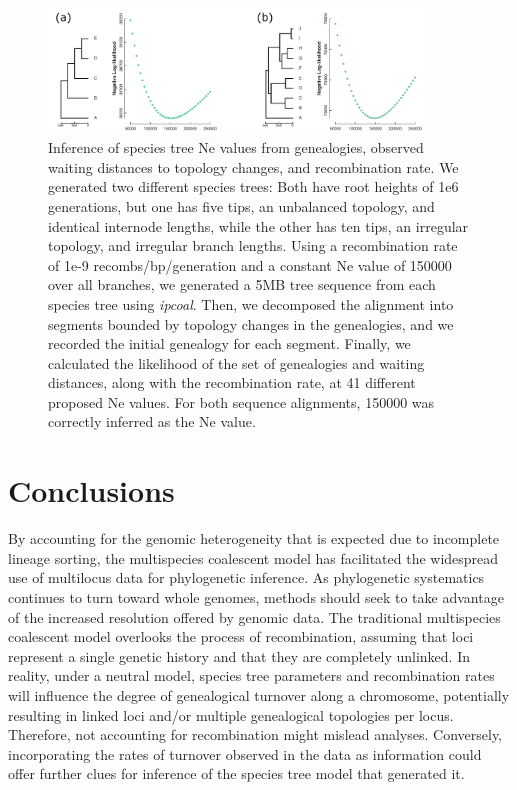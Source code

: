 \documentclass[11pt]{article}
\begin{document}
\begin{figure}
	\centering
	\includegraphics[width=0.9\textwidth]{figures/Fig6-constant_ne_inf.pdf}
	\caption{Inference of species tree Ne values from genealogies, observed waiting distances to topology changes, and recombination rate. We generated two different species trees: Both have root heights of 1e6 generations, but one has five tips, an unbalanced topology, and identical internode lengths, while the other has ten tips, an irregular topology, and irregular branch lengths. Using a recombination rate of 1e-9 recombs/bp/generation and a constant Ne value of 150000 over all branches, we generated a 5MB tree sequence from each species tree using \emph{ipcoal}. Then, we decomposed the alignment into segments bounded by topology changes in the genealogies, and we recorded the initial genealogy for each segment. Finally, we calculated the likelihood of the set of genealogies and waiting distances, along with the recombination rate, at 41 different proposed Ne values. For both sequence alignments, 150000 was correctly inferred as the Ne value.}
	 \label{fig:fig5}
\end{figure}

\section{Conclusions}

By accounting for the genomic heterogeneity that is expected due to incomplete lineage sorting, the multispecies coalescent model has facilitated the widespread use of multilocus data for phylogenetic inference. As phylogenetic systematics continues to turn toward whole genomes, methods should seek to take advantage of the increased resolution offered by genomic data. The traditional multispecies coalescent model overlooks the process of recombination, assuming that loci represent a single genetic history and that they are completely unlinked. In reality, under a neutral model, species tree parameters and recombination rates will influence the degree of genealogical turnover along a chromosome, potentially resulting in linked loci and/or multiple genealogical topologies per locus. Therefore, not accounting for recombination might mislead analyses. Conversely, incorporating the rates of turnover observed in the data as information could offer further clues for inference of the species tree model that generated it. 
\end{document}

